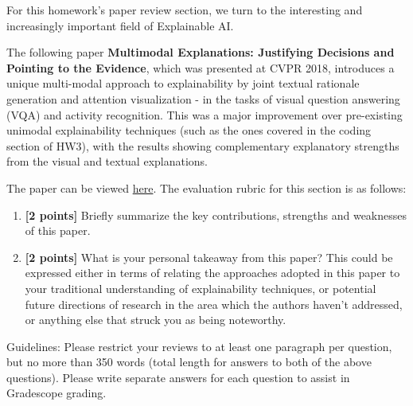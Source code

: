 For this homework's paper review section, we turn to the interesting and increasingly important field of Explainable AI. 

\vspace{2mm}

The following paper \textbf{Multimodal Explanations: Justifying Decisions and Pointing to the Evidence}, which was presented at CVPR 2018, introduces a unique multi-modal approach to explainability by joint textual rationale generation and attention visualization - in the tasks of visual question answering (VQA) and activity recognition. This was a major improvement over pre-existing unimodal explainability techniques (such as the ones covered in the coding section of HW3), with the results showing complementary explanatory strengths from the visual and textual explanations. 

\vspace{2mm}

The paper can be viewed \href{https://openaccess.thecvf.com/content_cvpr_2018/html/Park_Multimodal_Explanations_Justifying_CVPR_2018_paper.html}{here}.
\vspace{2mm}
The evaluation rubric for this section is as follows:
\begin{enumerate}[resume]
\item
\textbf{[2 points]}
Briefly summarize the key contributions, strengths and weaknesses of this paper.

\item
\textbf{[2 points]}
What is your personal takeaway from this paper? This could be expressed either in terms of relating the approaches adopted in this paper to your traditional understanding of explainability techniques, or potential future directions of research in the area which the authors haven't addressed, or anything else that struck you as being noteworthy. 

\end{enumerate}

Guidelines: Please restrict your reviews to at least one paragraph per question, but no more than 350 words (total length for answers to both of the above questions). Please write separate answers for each question to assist in Gradescope grading.